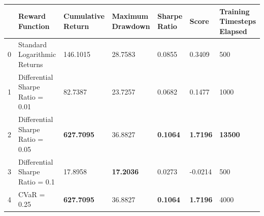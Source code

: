 \begin{tabular}{lllllll}
\toprule
 & Reward Function & Cumulative Return & Maximum Drawdown & Sharpe Ratio & Score & Training Timesteps Elapsed \\
\midrule
0 & Standard Logarithmic Returns & 146.1015 & 28.7583 & 0.0855 & 0.3409 & 500 \\
1 & Differential Sharpe Ratio = 0.01 & 82.7387 & 23.7257 & 0.0682 & 0.1477 & 1000 \\
2 & Differential Sharpe Ratio = 0.05 & \textbf{627.7095} & 36.8827 & \textbf{0.1064} & \textbf{1.7196} & \textbf{13500} \\
3 & Differential Sharpe Ratio = 0.1 & 17.8958 & \textbf{17.2036} & 0.0273 & -0.0214 & 500 \\
4 & CVaR = 0.25 & \textbf{627.7095} & 36.8827 & \textbf{0.1064} & \textbf{1.7196} & 4000 \\
\bottomrule
\end{tabular}
